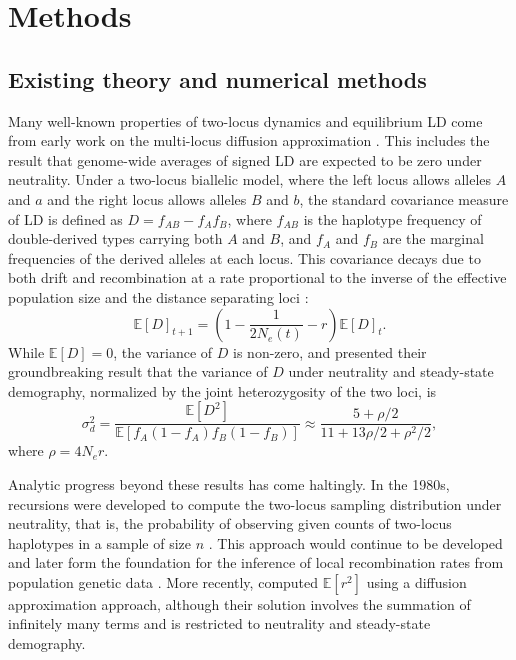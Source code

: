 \documentclass[]{article}
\newcommand{\E}{\mathbb{E}}
\begin{document}
\section{Methods}\label{sec:methods}

\subsection{Existing theory and numerical methods}

Many well-known properties of two-locus dynamics and equilibrium LD come from
early work on the multi-locus diffusion approximation \citep{Kimura1955-qe,
Hill1968-vu, Ohta1969-ie, Ohta1971-yd}.  This includes the result that
genome-wide averages of signed LD are expected to be zero under neutrality.
Under a two-locus biallelic model, where the left locus allows alleles \(A\)
and \(a\) and the right locus allows alleles \(B\) and \(b\), the standard
covariance measure of LD is defined as \(D = f_{AB} - f_{A}f_{B}\), where
\(f_{AB}\) is the haplotype frequency of double-derived types carrying both
\(A\) and \(B\), and \(f_{A}\) and \(f_{B}\) are the marginal frequencies of
the derived alleles at each locus. This covariance decays due to both drift and
recombination at a rate proportional to the inverse of the effective population
size and the distance separating loci \citep{Hill1968-vu}:
\[\E[D]_{t+1} = \left(1 - \frac{1}{2N_e(t)} - r \right)\E[D]_t.\]
While \(\E[D] = 0\), the variance of \(D\) is non-zero, and \citet{Ohta1971-yd}
presented their groundbreaking result that the variance of \(D\) under
neutrality and steady-state demography, normalized by the joint heterozygosity
of the two loci, is
\begin{equation}
    \label{eq:ohta}
    \sigma_d^2 = \frac{\E[D^2]}{\E[f_A(1-f_A)f_B(1-f_B)]}
    \approx\frac{5 + \rho / 2}{11 + 13\rho/ 2 + \rho^2 / 2},
\end{equation}
where \(\rho = 4N_e r\).

Analytic progress beyond these results has come haltingly. In the 1980s,
recursions were developed to compute the two-locus sampling distribution under
neutrality, that is, the probability of observing given counts of two-locus
haplotypes in a sample of size \(n\) \citep{Golding1984-pu}. This approach
would continue to be developed and later form the foundation for the inference
of local recombination rates from population genetic data
\citep{Hudson2001-sg,McVean2004-gj}. More recently, \citet{Song2007-qk}
computed \(\E[r^2]\) using a diffusion approximation approach, although their
solution involves the summation of infinitely many terms and is restricted to
neutrality and steady-state demography.
\end{document}
